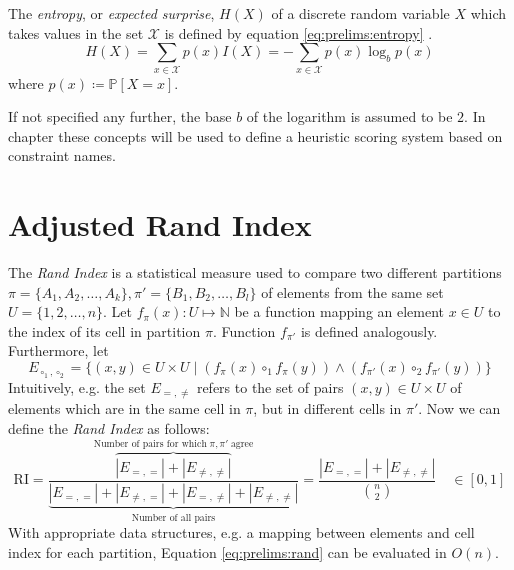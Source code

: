 		The \textit{entropy}, or \textit{expected surprise}, $H(X)$ of a discrete random variable $X$ which takes values in the set $\mathcal{X}$ is defined by equation \ref{eq:prelims:entropy} \cite{coverElementsInformationTheory2006}.
		\begin{equation}
		\label{eq:prelims:entropy}
			H(X) =  \sum_{x \in \mathcal{X}} p(x) I(X) = - \sum_{x \in \mathcal{X}} p(x) \log_b p(x)
		\end{equation}
		where $p(x) \coloneq \mathbb{P}[X = x]$.
		
		If not specified any further, the base $b$ of the logarithm is assumed to be $2$.
		In chapter  these concepts will be used to define a heuristic scoring system based on constraint names.
		
	\section{Adjusted Rand Index}
	\label{chap:prelims:rand}
	
		The \textit{Rand Index} is a statistical measure used to compare two different partitions $\pi = \{ A_1, A_2, \ldots, A_k \}, \pi' = \{ B_1, B_2, \ldots, B_l \}$ of elements from the same set $U = \{ 1, 2, \ldots, n \}$.
		Let $f_\pi(x): U \mapsto \mathbb{N}$ be a function mapping an element $x \in U$ to the index of its cell in partition $\pi$. Function $f_{\pi'}$ is defined analogously.
		Furthermore, let
		\begin{equation*}
			E_{\circ_1, \circ_2} = \{ (x, y) \in U \times U \mid (f_\pi(x) \circ_1 f_\pi(y)) \land (f_{\pi'}(x) \circ_2 f_{\pi'}(y)) \}
		\end{equation*}
		Intuitively, e.g. the set $E_{=, \not=}$ refers to the set of pairs $(x, y) \in U \times U$ of elements which are in the same cell in $\pi$, but in different cells in $\pi'$.
		Now we can define the \textit{Rand Index} as follows:
		\begin{equation}
			\label{eq:prelims:rand}
			\mathrm{RI} = \frac{\overbrace{|E_{=, =}| + |E_{\not=, \not=}|}^{\text{Number of pairs for which}\; \pi, \pi' \;\text{agree}}}{\underbrace{|E_{=, =}| + |E_{\not=, =}| + |E_{=, \not=}| + |E_{\not=, \not=}|}_{\text{Number of all pairs}}} = \frac{|E_{=, =}| + |E_{\not=, \not=}|}{\binom{n}{2}} \quad \in [0, 1]
		\end{equation}
		With appropriate data structures, e.g. a mapping between elements and cell index for each partition, Equation \ref{eq:prelims:rand} can be evaluated in $O(n)$.
		
